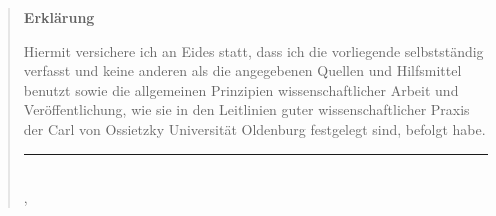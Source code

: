 \begin{abstract}
	\begin{center}
		\Large{\textbf{Erklärung}}
	\end{center}

	\vspace*{3em}
	Hiermit versichere ich an Eides statt, dass ich die vorliegende \paperType{} selbstständig verfasst und keine anderen als die angegebenen Quellen und Hilfsmittel benutzt sowie die allgemeinen Prinzipien wissenschaftlicher Arbeit und Veröffentlichung, wie sie in den Leitlinien guter wissenschaftlicher Praxis der Carl von Ossietzky Universität Oldenburg festgelegt sind, befolgt habe.
	\vspace*{3em}

	\rule{\textwidth}{0.5pt}\\
	\hspace*{1cm}\paperLocation, \paperDate \hfill \paperAuthor\hspace*{.5cm}
\end{abstract}
